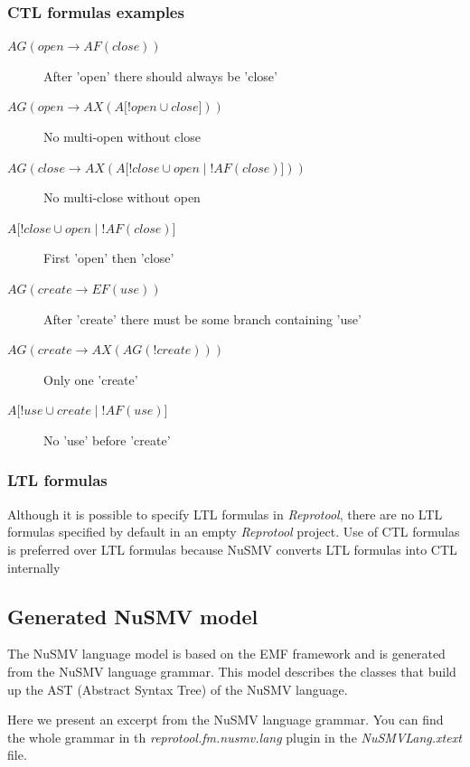 \subsubsection{CTL formulas examples}
\begin{description}
 \item[$AG(open \rightarrow AF(close))$] After 'open' there should always be 'close'
 \item[$AG(open \rightarrow AX(A\lbrack!open \cup close\rbrack))$] No multi-open without close
 \item[$AG(close \rightarrow AX(A\lbrack!close \cup open \mid !AF(close) \rbrack))$] No multi-close without open
 \item[$A\lbrack !close \cup open \mid !AF(close)\rbrack$] First 'open' then 'close'
 \item[$AG( create \rightarrow EF(use) )$] After 'create' there must be some branch containing 'use'
 \item[$AG( create \rightarrow AX(AG(!create)) )$] Only one 'create'
 \item[$A\lbrack !use \cup create \mid !AF(use)\rbrack$] No 'use' before 'create'
\end{description}


\subsubsection{LTL formulas}
Although it is possible to specify LTL formulas in \emph{Reprotool}, there are no LTL formulas specified by default in an empty
\emph{Reprotool} project. Use of CTL formulas is preferred over LTL formulas because NuSMV converts LTL formulas into CTL internally
\cite{NuSMV-ltl-fmsd97}

\subsection{Generated NuSMV model}

The NuSMV language model is based on the EMF framework and is generated from the NuSMV language grammar.
This model describes the classes that build up the AST (Abstract Syntax Tree) of the NuSMV language.

Here we present an excerpt from the NuSMV language grammar. You can find the whole grammar in th
\emph{reprotool.fm.nusmv.lang} plugin in the \emph{NuSMVLang.xtext} file.

